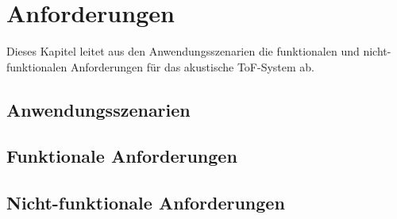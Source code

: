 \section{Anforderungen}

Dieses Kapitel leitet aus den Anwendungsszenarien die funktionalen und nicht-funktionalen Anforderungen für das akustische ToF-System ab.

\subsection{Anwendungsszenarien}

\subsection{Funktionale Anforderungen}

\subsection{Nicht-funktionale Anforderungen}
